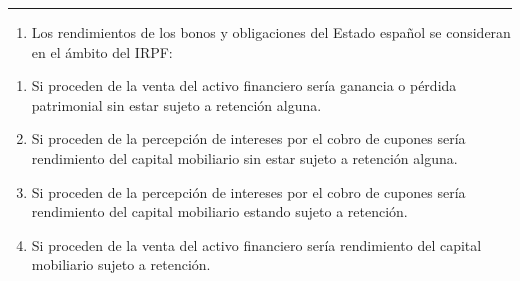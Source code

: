 \documentclass[
  letterpaper,
  DIV=11,
  numbers=noendperiod]{scrartcl}
\providecommand{\tightlist}{%
  \setlength{\itemsep}{0pt}\setlength{\parskip}{0pt}}\usepackage{longtable,booktabs,array}
\begin{document}
\begin{center}\rule{0.5\linewidth}{0.5pt}\end{center}

\begin{enumerate}
\def\labelenumi{\arabic{enumi}.}
\setcounter{enumi}{12}
\tightlist
\item
  Los rendimientos de los bonos y obligaciones del Estado español se
  consideran en el ámbito del IRPF:
\end{enumerate}

\begin{enumerate}
\def\labelenumi{\alph{enumi}.}
\item
  Si proceden de la venta del activo financiero sería ganancia o pérdida
  patrimonial sin estar sujeto a retención alguna.
\item
  Si proceden de la percepción de intereses por el cobro de cupones
  sería rendimiento del capital mobiliario sin estar sujeto a retención
  alguna.
\item
  Si proceden de la percepción de intereses por el cobro de cupones
  sería rendimiento del capital mobiliario estando sujeto a retención.
\item
  Si proceden de la venta del activo financiero sería rendimiento del
  capital mobiliario sujeto a retención.
\end{enumerate}
\end{document}
